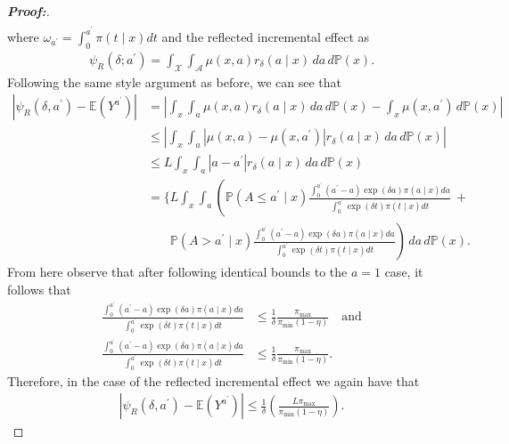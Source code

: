 \documentclass[11pt,twoside]{article}
\newcommand{\Pb}{\mathbb{P}}
\newcommand{\E}{\mathbb{E}}
\theoremstyle{definition}
\theoremstyle{remark}
\begin{document}
\begin{proof}[\textbf{Proof:}]
\begin{align*}
\end{align*}
where $\omega_{a^\prime} = \int^{a^{\prime}}_0 \pi(t \mid x) dt$ and the reflected incremental effect as
\begin{align*}
    \psi_R(\delta; a^\prime) =  \int_\mathcal{X} \int_\mathcal{A} \mu(x, a) r_\delta(a \mid x) \, da \, d\mathbb{P}(x).
\end{align*}
Following the same style argument as before, we can see that
\begin{align*}
     | \psi_R(\delta, a^\prime) - \E(Y^{a^\prime})| &=  \left| \int_x \int_a \mu(x,a) r_\delta(a \mid x) \, da \, d\Pb(x) - \int_x \mu(x,a^\prime) \, d\Pb(x) \right| \\
     &\leq  \left| \int_x \int_a \left  | \mu(x,a) - \mu(x, a^\prime) \right| r_\delta(a \mid x) \, da \, d\Pb(x)\right| \\
     &\leq L \int_x \int_a |a-a^\prime| r_\delta(a \mid x) \, da \, d\Pb(x) \\
     &= \Bigg\{ L \int_x \int_a \left( \mathbb{P}(A \leq a^\prime \mid x) \frac{\int^{a^\prime}_0 (a^\prime - a) \exp(\delta a) \pi(a \mid x) da}{\int^{a^\prime}_0 \exp(\delta t) \pi(t \mid x) dt} \ + \right. \\
     &\phantom{{}={\Bigg\{ }} \left. \mathbb{P}(A > a^\prime \mid x) \frac{\int^{a^\prime}_0 (a^\prime - a) \exp(\delta a) \pi(a \mid x) da}{\int^{a^\prime}_0 \exp(\delta t) \pi(t \mid x) dt} \right) \, da \, d\Pb(x).
\end{align*}
From here observe that after following identical bounds to the $a = 1$ case, it follows that
\begin{align*}
     \frac{\int^{a^\prime}_0 (a^\prime - a) \exp(\delta a) \pi(a \mid x) da}{\int^{a^\prime}_0 \exp(\delta t) \pi(t \mid x) dt} &\leq \frac{1}{\delta} \frac{\pi_{\max}}{\pi_{\min}(1 - \eta)} \quad \text{and} \\
     \frac{\int^{a^\prime}_0 (a^\prime - a) \exp(\delta a) \pi(a \mid x) da}{\int^{a^\prime}_0 \exp(\delta t) \pi(t \mid x) dt} &\leq \frac{1}{\delta} \frac{\pi_{\max}}{\pi_{\min}(1 - \eta)}.
\end{align*}
Therefore, in the case of the reflected incremental effect we again have that 
\begin{align*}
        | \psi_R(\delta, a^\prime) - \E(Y^{a^\prime})| \leq \frac{1}{\delta} \left( \frac{L \pi_{\max}}{\pi_{\min}(1 - \eta)} \right).
\end{align*}
\end{proof}
\end{document}

